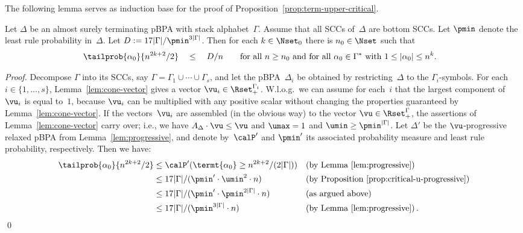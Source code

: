 The following lemma serves as induction base for the proof of Proposition~\ref{prop:term-upper-critical}.
\begin{lemma} \label{lem:critical-strongly-connected}
  Let $\Delta$ be an almost surely terminating pBPA with stack alphabet~$\Gamma$.
  Assume that all SCCs of~$\Delta$ are bottom SCCs.
  Let $\pmin$ denote the least rule probability in~$\Delta$.
  Let $D := 17 |\Gamma| / \pmin^{3|\Gamma|}$.
Then for each $k \in \Nset_0$ there is $n_0 \in \Nset$ such that
   \begin{align*}
     \tailprob{\alpha_0}{ n^{2k+2} / 2 } \quad & \le\quad D / n
      && \quad \text{for all $n \ge n_0$ and for all $\alpha_0 \in \Gamma^*$ with $1 \le |\alpha_0| \le n^k$.}
   \end{align*}
\end{lemma}
\begin{proof}
Decompose $\Gamma$ into its SCCs, say $\Gamma = \Gamma_1 \cup \cdots \cup \Gamma_s$,
 and let the pBPA~$\Delta_i$ be obtained by restricting~$\Delta$ to the $\Gamma_i$-symbols.
For each $i \in \{1, \ldots, s\}$, Lemma~\ref{lem:cone-vector} gives a vector $\vu_i \in \Rset_+^{\Gamma_i}$.
W.l.o.g.\ we can assume for each~$i$ that the largest component of~$\vu_i$ is equal to~$1$,
 because $\vu_i$ can be multiplied with any positive scalar without changing the properties guaranteed by Lemma~\ref{lem:cone-vector}.
If the vectors~$\vu_i$ are assembled (in the obvious way) to the vector $\vu \in \Rset_+^\Gamma$,
 the assertions of Lemma~\ref{lem:cone-vector} carry over;
 i.e., we have $A_\Delta \cdot \vu \le \vu$ and $\umax = 1$ and $\umin \ge \pmin^{|\Gamma|}$.
Let $\Delta'$ be the $\vu$-progressive relaxed pBPA from Lemma~\ref{lem:progressive},
 and denote by~$\calP'$ and $\pmin'$ its associated probability measure and least rule probability, respectively.
Then we have:
\begin{align*}
 \tailprob{\alpha_0}{ n^{2k+2} / 2 }
 & \le \calP'( \termt{\alpha_0} \ge n^{2k+2} / (2 |\Gamma|) )   && \text{(by Lemma~\ref{lem:progressive})} \\
 & \le 17 |\Gamma| / ( \pmin' \cdot \umin^2 \cdot n )           && \text{(by Proposition~\ref{prop:critical-u-progressive})} \\
 & \le 17 |\Gamma| / ( \pmin' \cdot \pmin^{2|\Gamma|} \cdot n ) && \text{(as argued above)} \\
 & \le 17 |\Gamma| / ( \pmin^{3|\Gamma|} \cdot n )              && \text{(by Lemma~\ref{lem:progressive})\,.}
\end{align*}
\qed
\end{proof}

